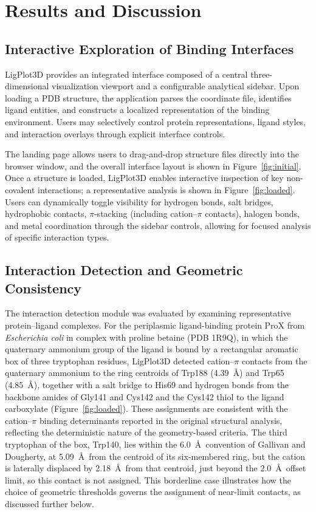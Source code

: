 \documentclass[journal=jacsat,manuscript=article]{achemso}
\begin{document}
\section{Results and Discussion}

\subsection{Interactive Exploration of Binding Interfaces}
LigPlot3D provides an integrated interface composed of a central three-dimensional visualization viewport and a configurable analytical sidebar. Upon loading a PDB structure, the application parses the coordinate file, identifies ligand entities, and constructs a localized representation of the binding environment. Users may selectively control protein representations, ligand styles, and interaction overlays through explicit interface controls.

The landing page allows users to drag-and-drop structure files directly into the browser window, and the overall interface layout is shown in Figure~\ref{fig:initial}. Once a structure is loaded, LigPlot3D enables interactive inspection of key non-covalent interactions; a representative analysis is shown in Figure~\ref{fig:loaded}. Users can dynamically toggle visibility for hydrogen bonds, salt bridges, hydrophobic contacts, $\pi$-stacking (including cation--$\pi$ contacts), halogen bonds, and metal coordination through the sidebar controls, allowing for focused analysis of specific interaction types.

\subsection{Interaction Detection and Geometric Consistency}
The interaction detection module was evaluated by examining representative protein--ligand complexes. For the periplasmic ligand-binding protein ProX from \textit{Escherichia coli} in complex with proline betaine (PDB 1R9Q)\cite{schiefner2004cation}, in which the quaternary ammonium group of the ligand is bound by a rectangular aromatic box of three tryptophan residues, LigPlot3D detected cation--$\pi$ contacts from the quaternary ammonium to the ring centroids of Trp188 (4.39~\AA) and Trp65 (4.85~\AA), together with a salt bridge to His69 and hydrogen bonds from the backbone amides of Gly141 and Cys142 and the Cys142 thiol to the ligand carboxylate (Figure~\ref{fig:loaded}). These assignments are consistent with the cation--$\pi$ binding determinants reported in the original structural analysis, reflecting the deterministic nature of the geometry-based criteria. The third tryptophan of the box, Trp140, lies within the 6.0~\AA\ convention of Gallivan and Dougherty\cite{gallivan1999cation}, at 5.09~\AA\ from the centroid of its six-membered ring, but the cation is laterally displaced by 2.18~\AA\ from that centroid, just beyond the 2.0~\AA\ offset limit, so this contact is not assigned. This borderline case illustrates how the choice of geometric thresholds governs the assignment of near-limit contacts, as discussed further below.
\end{document}

